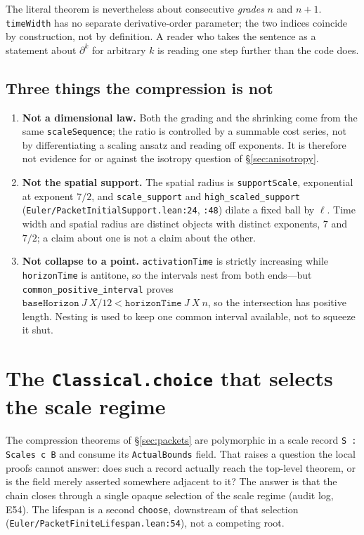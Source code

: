 \documentclass[11pt]{article}
\newcommand{\ct}[1]{\texttt{#1}}
\newcommand{\file}[1]{\texttt{\small #1}}
\theoremstyle{plain}
\theoremstyle{definition}
\theoremstyle{remark}
\begin{document}
The literal theorem is nevertheless about consecutive \emph{grades} $n$ and
$n+1$. \ct{timeWidth} has no separate derivative-order parameter; the two
indices coincide by construction, not by definition. A reader who takes the
sentence as a statement about $\partial^{k}$ for arbitrary $k$ is reading one
step further than the code does.

\subsection{Three things the compression is not}

\begin{enumerate}
\item \textbf{Not a dimensional law.} Both the grading and the shrinking come
from the same \ct{scaleSequence}; the ratio is controlled by a summable cost
series, not by differentiating a scaling ansatz and reading off exponents. It
is therefore not evidence for or against the isotropy question of
\S\ref{sec:anisotropy}.
\item \textbf{Not the spatial support.} The spatial radius is \ct{supportScale},
exponential at exponent $7/2$, and \ct{scale\_support} and \ct{high\_scaled\_support}
(\file{Euler/PacketInitialSupport.lean:24}, \file{:48}) dilate a fixed ball by
$\ell$. Time width and spatial radius are distinct objects with distinct
exponents, $7$ and $7/2$; a claim about one is not a claim about the other.
\item \textbf{Not collapse to a point.} \ct{activationTime} is strictly
increasing while \ct{horizonTime} is antitone, so the intervals nest from both
ends---but \ct{common\_positive\_interval} proves
$\ct{baseHorizon}\ J\ X/12 < \ct{horizonTime}\ J\ X\ n$, so the intersection
has positive length. Nesting is used to keep one common interval available, not
to squeeze it shut.
\end{enumerate}

\section{The \texorpdfstring{\ct{Classical.choice}}{Classical.choice} that selects the scale regime}
\label{sec:root}

The compression theorems of \S\ref{sec:packets} are polymorphic in a scale
record \ct{S : Scales c B} and consume its \ct{ActualBounds} field. That raises a
question the local proofs cannot answer: does such a record actually reach the
top-level theorem, or is the field merely asserted somewhere adjacent to it? The
answer is that the chain closes through a single opaque selection of the scale
regime (audit log, E54). The lifespan is a second \ct{choose}, downstream of
that selection (\file{Euler/PacketFiniteLifespan.lean:54}), not a competing root.
\end{document}
